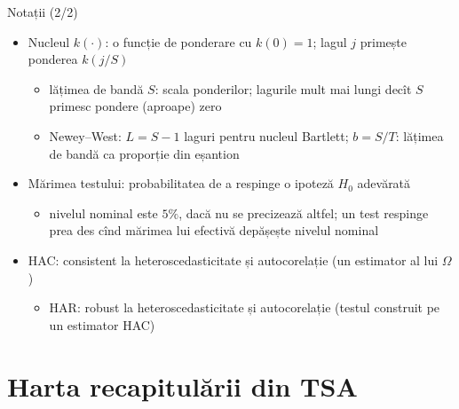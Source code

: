 \begin{frame}{Notații (2/2)}
\itemsize{\small}
\begin{itemize}
    \item Nucleul $k(\cdot)$: o funcție de ponderare cu $k(0) = 1$; lagul $j$ primește ponderea $k(j/S)$
    \begin{itemize}
        \item lățimea de bandă $S$: scala ponderilor; lagurile mult mai lungi decît $S$ primesc pondere (aproape) zero
        \item Newey--West: $L = S - 1$ laguri pentru nucleul Bartlett; $b = S/T$: lățimea de bandă ca proporție din eșantion
    \end{itemize}
    \item Mărimea testului: probabilitatea de a respinge o ipoteză $H_0$ adevărată
    \begin{itemize}
        \item nivelul nominal este $5\%$, dacă nu se precizează altfel; un test respinge prea des cînd mărimea lui efectivă depășește nivelul nominal
    \end{itemize}
    \item HAC: consistent la heteroscedasticitate și autocorelație (un estimator al lui $\Omega$)
    \begin{itemize}
        \item HAR: robust la heteroscedasticitate și autocorelație (testul construit pe un estimator HAC)
    \end{itemize}
\end{itemize}
\end{frame}


\section{Harta recapitulării din TSA}

